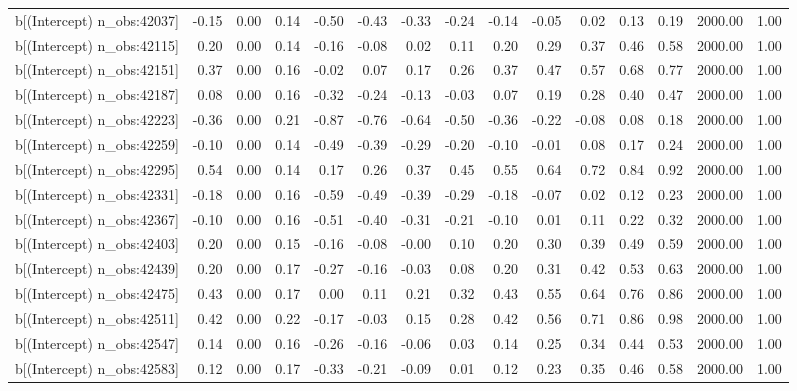 \begin{table}[ht]
\begin{tabular}{rrrrrrrrrrrrrrr}
  b[(Intercept) n\_obs:42037] & -0.15 & 0.00 & 0.14 & -0.50 & -0.43 & -0.33 & -0.24 & -0.14 & -0.05 & 0.02 & 0.13 & 0.19 & 2000.00 & 1.00 \\ 
  b[(Intercept) n\_obs:42115] & 0.20 & 0.00 & 0.14 & -0.16 & -0.08 & 0.02 & 0.11 & 0.20 & 0.29 & 0.37 & 0.46 & 0.58 & 2000.00 & 1.00 \\ 
  b[(Intercept) n\_obs:42151] & 0.37 & 0.00 & 0.16 & -0.02 & 0.07 & 0.17 & 0.26 & 0.37 & 0.47 & 0.57 & 0.68 & 0.77 & 2000.00 & 1.00 \\ 
  b[(Intercept) n\_obs:42187] & 0.08 & 0.00 & 0.16 & -0.32 & -0.24 & -0.13 & -0.03 & 0.07 & 0.19 & 0.28 & 0.40 & 0.47 & 2000.00 & 1.00 \\ 
  b[(Intercept) n\_obs:42223] & -0.36 & 0.00 & 0.21 & -0.87 & -0.76 & -0.64 & -0.50 & -0.36 & -0.22 & -0.08 & 0.08 & 0.18 & 2000.00 & 1.00 \\ 
  b[(Intercept) n\_obs:42259] & -0.10 & 0.00 & 0.14 & -0.49 & -0.39 & -0.29 & -0.20 & -0.10 & -0.01 & 0.08 & 0.17 & 0.24 & 2000.00 & 1.00 \\ 
  b[(Intercept) n\_obs:42295] & 0.54 & 0.00 & 0.14 & 0.17 & 0.26 & 0.37 & 0.45 & 0.55 & 0.64 & 0.72 & 0.84 & 0.92 & 2000.00 & 1.00 \\ 
  b[(Intercept) n\_obs:42331] & -0.18 & 0.00 & 0.16 & -0.59 & -0.49 & -0.39 & -0.29 & -0.18 & -0.07 & 0.02 & 0.12 & 0.23 & 2000.00 & 1.00 \\ 
  b[(Intercept) n\_obs:42367] & -0.10 & 0.00 & 0.16 & -0.51 & -0.40 & -0.31 & -0.21 & -0.10 & 0.01 & 0.11 & 0.22 & 0.32 & 2000.00 & 1.00 \\ 
  b[(Intercept) n\_obs:42403] & 0.20 & 0.00 & 0.15 & -0.16 & -0.08 & -0.00 & 0.10 & 0.20 & 0.30 & 0.39 & 0.49 & 0.59 & 2000.00 & 1.00 \\ 
  b[(Intercept) n\_obs:42439] & 0.20 & 0.00 & 0.17 & -0.27 & -0.16 & -0.03 & 0.08 & 0.20 & 0.31 & 0.42 & 0.53 & 0.63 & 2000.00 & 1.00 \\ 
  b[(Intercept) n\_obs:42475] & 0.43 & 0.00 & 0.17 & 0.00 & 0.11 & 0.21 & 0.32 & 0.43 & 0.55 & 0.64 & 0.76 & 0.86 & 2000.00 & 1.00 \\ 
  b[(Intercept) n\_obs:42511] & 0.42 & 0.00 & 0.22 & -0.17 & -0.03 & 0.15 & 0.28 & 0.42 & 0.56 & 0.71 & 0.86 & 0.98 & 2000.00 & 1.00 \\ 
  b[(Intercept) n\_obs:42547] & 0.14 & 0.00 & 0.16 & -0.26 & -0.16 & -0.06 & 0.03 & 0.14 & 0.25 & 0.34 & 0.44 & 0.53 & 2000.00 & 1.00 \\ 
  b[(Intercept) n\_obs:42583] & 0.12 & 0.00 & 0.17 & -0.33 & -0.21 & -0.09 & 0.01 & 0.12 & 0.23 & 0.35 & 0.46 & 0.58 & 2000.00 & 1.00 \\ 

\end{tabular}
\end{table}
